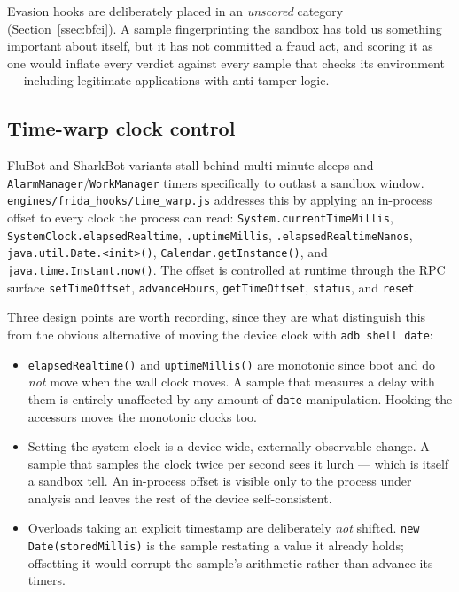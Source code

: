 \documentclass{article}
\begin{document}
Evasion hooks are deliberately placed in an \emph{unscored} category
(Section~\ref{ssec:bfci}). A sample fingerprinting the sandbox has told us
something important about itself, but it has not committed a fraud act, and
scoring it as one would inflate every verdict against every sample that checks
its environment --- including legitimate applications with anti-tamper logic.

\subsection{Time-warp clock control}
\label{ssec:timewarp}

FluBot and SharkBot variants stall behind multi-minute sleeps and
\texttt{AlarmManager}/\texttt{WorkManager} timers specifically to outlast a
sandbox window. \texttt{engines/frida\_hooks/time\_warp.js} addresses this by
applying an in-process offset to every clock the process can read:
\texttt{System.currentTimeMillis}, \texttt{SystemClock.elapsedRealtime},
\texttt{.uptimeMillis}, \texttt{.elapsedRealtimeNanos},
\texttt{java.util.Date.<init>()}, \texttt{Calendar.getInstance()}, and
\texttt{java.time.Instant.now()}. The offset is controlled at runtime through
the RPC surface \texttt{setTimeOffset}, \texttt{advanceHours},
\texttt{getTimeOffset}, \texttt{status}, and \texttt{reset}.

Three design points are worth recording, since they are what distinguish this
from the obvious alternative of moving the device clock with
\texttt{adb shell date}:

\begin{itemize}
\item \texttt{elapsedRealtime()} and \texttt{uptimeMillis()} are monotonic since
boot and do \emph{not} move when the wall clock moves. A sample that measures a
delay with them is entirely unaffected by any amount of \texttt{date}
manipulation. Hooking the accessors moves the monotonic clocks too.
\item Setting the system clock is a device-wide, externally observable change.
A sample that samples the clock twice per second sees it lurch --- which is
itself a sandbox tell. An in-process offset is visible only to the process under
analysis and leaves the rest of the device self-consistent.
\item Overloads taking an explicit timestamp are deliberately \emph{not}
shifted. \texttt{new Date(storedMillis)} is the sample restating a value it
already holds; offsetting it would corrupt the sample's arithmetic rather than
advance its timers.
\end{itemize}
\end{document}
